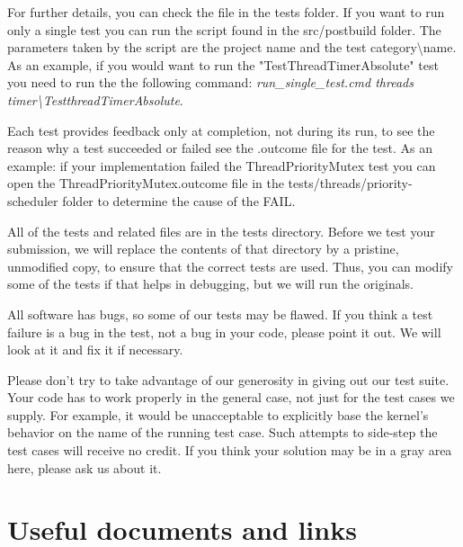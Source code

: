 For further details, you can check the  file in the tests folder. If you
want to run only a single test you can run the  script found in the
src/postbuild folder. The parameters taken by the script are the project name and the test category\textbackslash name.
As an example, if you would want to run the "TestThreadTimerAbsolute" test you need to run the
the following command: \textit{run\_single\_test.cmd threads timer\textbackslash TestthreadTimerAbsolute}.

Each test provides feedback only at completion, not during its run, to see the reason why a test
succeeded or failed see the .outcome file for the test. As an example: if your implementation failed
the ThreadPriorityMutex test you can open the ThreadPriorityMutex.outcome file in the
tests/threads/priority-scheduler folder to determine the cause of the FAIL.

All of the tests and related files are in the tests directory. Before we test your submission,
we will replace the contents of that directory by a pristine, unmodified copy, to ensure that the
correct tests are used. Thus, you can modify some of the tests if that helps in debugging, but we
will run the originals.

All software has bugs, so some of our tests may be flawed. If you think a test failure is a bug in
the test, not a bug in your code, please point it out. We will look at it and fix it if necessary.

Please don’t try to take advantage of our generosity in giving out our test suite. Your code has to
work properly in the general case, not just for the test cases we supply. For example, it would be
unacceptable to explicitly base the kernel’s behavior on the name of the running test case. Such
attempts to side-step the test cases will receive no credit. If you think your solution may be in a
gray area here, please ask us about it.

\section{Useful documents and links}

